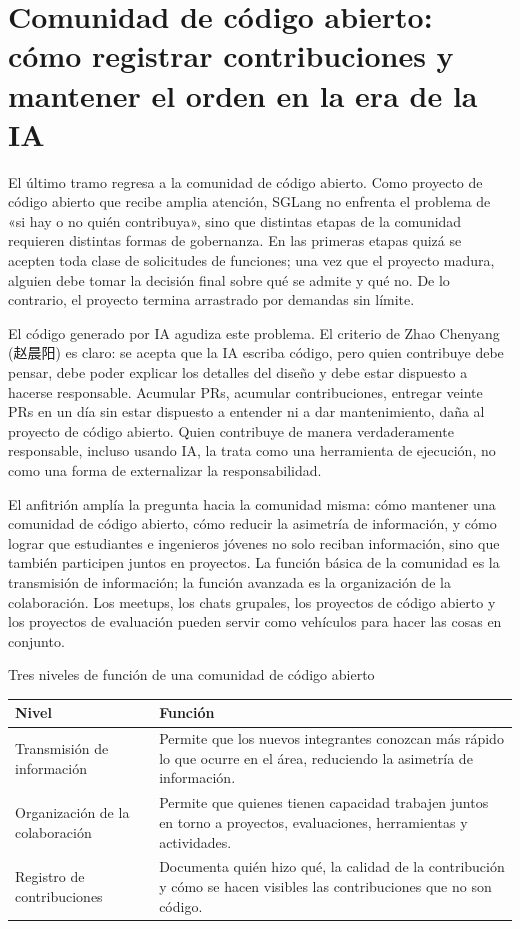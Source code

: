 \section{Comunidad de código abierto: cómo registrar contribuciones y mantener el orden en la era de la IA}

El último tramo regresa a la comunidad de código abierto. Como proyecto de código abierto que recibe amplia atención, SGLang no enfrenta el problema de «si hay o no quién contribuya», sino que distintas etapas de la comunidad requieren distintas formas de gobernanza. En las primeras etapas quizá se acepten toda clase de solicitudes de funciones; una vez que el proyecto madura, alguien debe tomar la decisión final sobre qué se admite y qué no. De lo contrario, el proyecto termina arrastrado por demandas sin límite.

El código generado por IA agudiza este problema. El criterio de Zhao Chenyang (赵晨阳) es claro: se acepta que la IA escriba código, pero quien contribuye debe pensar, debe poder explicar los detalles del diseño y debe estar dispuesto a hacerse responsable. Acumular PRs, acumular contribuciones, entregar veinte PRs en un día sin estar dispuesto a entender ni a dar mantenimiento, daña al proyecto de código abierto. Quien contribuye de manera verdaderamente responsable, incluso usando IA, la trata como una herramienta de ejecución, no como una forma de externalizar la responsabilidad.

El anfitrión amplía la pregunta hacia la comunidad misma: cómo mantener una comunidad de código abierto, cómo reducir la asimetría de información, y cómo lograr que estudiantes e ingenieros jóvenes no solo reciban información, sino que también participen juntos en proyectos. La función básica de la comunidad es la transmisión de información; la función avanzada es la organización de la colaboración. Los meetups, los chats grupales, los proyectos de código abierto y los proyectos de evaluación pueden servir como vehículos para hacer las cosas en conjunto.

\begin{knowledgebox}{Tres niveles de función de una comunidad de código abierto}
\begin{tabularx}{\textwidth}{>{\raggedright\arraybackslash}p{} Y}
\toprule
Nivel & Función \\
\midrule
Transmisión de información & Permite que los nuevos integrantes conozcan más rápido lo que ocurre en el área, reduciendo la asimetría de información. \\
Organización de la colaboración & Permite que quienes tienen capacidad trabajen juntos en torno a proyectos, evaluaciones, herramientas y actividades. \\
Registro de contribuciones & Documenta quién hizo qué, la calidad de la contribución y cómo se hacen visibles las contribuciones que no son código. \\
\bottomrule
\end{tabularx}
\end{knowledgebox}


